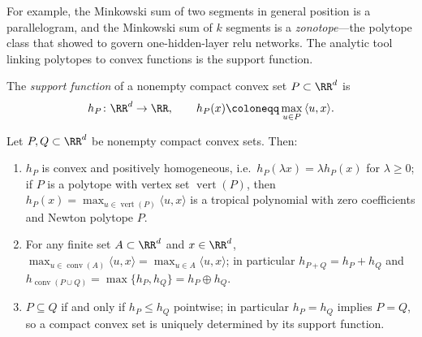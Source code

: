 For example, the Minkowski sum of two segments in general position is a parallelogram, and the Minkowski sum of $k$ segments is a \emph{zonotope}---the polytope class that \textcite{Zhang2018} showed to govern one-hidden-layer \ac{relu} networks. The analytic tool linking polytopes to convex functions is the support function.

\begin{definition}\label{def:support_function}
The \emph{support function} of a nonempty compact convex set $P \subset \RR^{d}$ is
\begin{equation}
	h_{P} \colon \RR^{d} \to \RR,
	\qquad
	h_{P}(x) \coloneqq \max_{u \in P}\, \langle u, x \rangle .
	\label{eq:support_function}
\end{equation}
\end{definition}

\begin{lemmaenv}\label{lem:support_properties}
Let $P, Q \subset \RR^{d}$ be nonempty compact convex sets. Then:
\begin{enumerate}
	\item $h_{P}$ is convex and positively homogeneous, i.e.\ $h_P(\lambda x) = \lambda h_P(x)$ for $\lambda \ge 0$; if $P$ is a polytope with vertex set $\operatorname{vert}(P)$, then $h_{P}(x) = \max_{u \in \operatorname{vert}(P)} \langle u, x \rangle$ is a tropical polynomial with zero coefficients and Newton polytope $P$.
	\item For any finite set $A \subset \RR^d$ and $x \in \RR^d$, $\max_{u \in \operatorname{conv}(A)} \langle u, x \rangle = \max_{u \in A} \langle u, x \rangle$; in particular $h_{P + Q} = h_{P} + h_{Q}$ and $h_{\operatorname{conv}(P \cup Q)} = \max\{h_{P}, h_{Q}\} = h_P \oplus h_Q$.
	\item $P \subseteq Q$ if and only if $h_{P} \le h_{Q}$ pointwise; in particular $h_{P} = h_{Q}$ implies $P = Q$, so a compact convex set is uniquely determined by its support function.
\end{enumerate}
\hfill{}
\end{lemmaenv}

